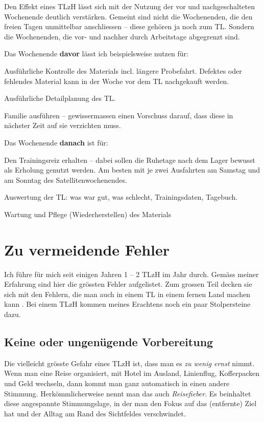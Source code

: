 \documentclass[a4paper,DIV13,BCOR0cm,draft=TRUE]{scrartcl}
\newcommand{\tlzh}{TLzH}
\begin{document}
Den Effekt eines \tlzh{} lässt sich mit der Nutzung der vor und nachgeschalteten Wochenende deutlich verstärken.
Gemeint sind nicht die Wochenenden, die den freien Tagen unmittelbar anschliessen -- diese gehören ja noch zum TL.
Sondern die Wochenenden, die vor- und nachher durch Arbeitstage abgegrenzt sind.

Das Wochenende \textbf{davor} lässt ich beispielsweise nutzen für:
\begin{itemize*}
  \item Ausführliche Kontrolle des Materials incl. längere Probefahrt.
    Defektes oder fehlendes Material kann in der Woche vor dem TL nachgekauft werden.
  \item Ausführliche Detailplanung des TL.
  \item Familie ausführen -- gewissermassen einen Vorschuss darauf, dass diese in nächster Zeit auf sie verzichten muss.
\end{itemize*}

Das Wochenende \textbf{danach} ist für:

\begin{itemize*}
  \item Den Trainingsreiz erhalten -- dabei sollen die Ruhetage nach dem Lager bewusst als Erholung genutzt werden.
    Am besten mit je zwei Ausfahrten am Samstag und am Sonntag des Satellitenwochenendes.
  \item Auswertung der TL: was war gut, was schlecht, Trainingsdaten, Tagebuch.
  \item Wartung und Pflege (Wiederherstellen) des Materials
\end{itemize*}


\section{Zu vermeidende Fehler}

Ich führe für mich seit einigen Jahren 1 -- 2 \tlzh{} im Jahr durch.
Gemäss meiner Erfahrung sind hier die grössten Fehler aufgelistet.
Zum grossen Teil decken sie sich mit den Fehlern, die man auch in einem TL in einem fernen Land machen kann \cite{Beck2016trainingslagersuenden}.
Bei einem \tlzh{} kommen meines Erachtens noch ein paar Stolpersteine dazu.

\subsection{Keine oder ungenügende Vorbereitung}

Die vielleicht grösste Gefahr eines \tlzh{} ist, dass man es \emph{zu wenig ernst} nimmt.
Wenn man eine Reise organisiert, mit Hotel im Ausland, Linienflug, Kofferpacken und Geld wechseln, 
dann kommt man ganz automatisch in einen andere Stimmung.
Herkömmlicherweise nennt man das auch \emph{Reisefieber}.
Es beinhaltet diese angespannte Stimmungslage, in der man den Fokus auf das (entfernte) Ziel hat und der Alltag am Rand des Sichtfeldes verschwindet.
\end{document}
